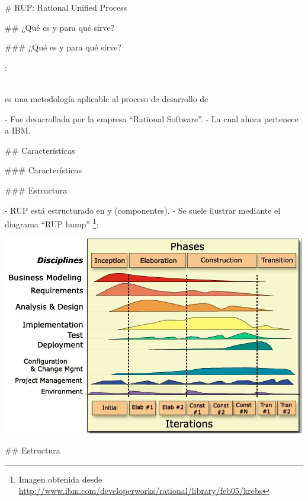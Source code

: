 # RUP: Rational Unified Process

## ¿Qué es y para qué sirve?

### ¿Qué es y para qué sirve?

:

\begin{rboxx}{}
\\
es una metodología aplicable al proceso de desarrollo de 
\end{rboxx}

- Fue desarrollada por la empresa ``Rational Software''.
    - La cual ahora pertenece a IBM.

## Características

### Características

\begin{center}
\begin{tiny}
\end{tiny}
\end{center}

### Estructura

- RUP está estructurado en  y  (componentes).
- Se suele ilustrar mediante el diagrama ``RUP hump'' \footnote{Imagen obtenida desde \url{http://www.ibm.com/developerworks/rational/library/feb05/krebs}}:

\vfill

\centering\includegraphics[width=.6\textwidth]{img/rup-ibm-phases.jpg}


## Estructura

